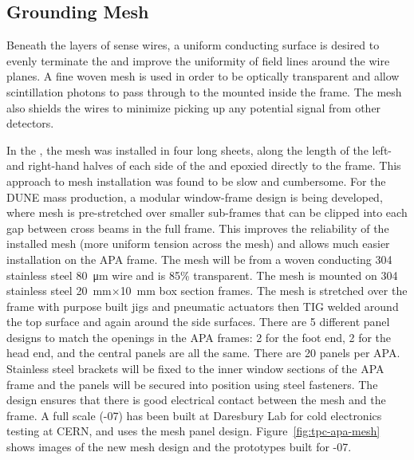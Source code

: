 \subsection{Grounding Mesh}
\label{sec:fdsp-apa-mesh}

Beneath the layers of sense wires, a uniform conducting surface is desired to evenly terminate the \efield and improve the uniformity of field lines around the wire planes.  A fine woven mesh is used in order to be optically transparent and allow scintillation photons to pass through to the  mounted inside the frame.  The mesh also shields the wires to minimize picking up any potential signal from other detectors.  

In the  , the mesh was installed in four long sheets, along the length of the left- and right-hand halves of each side of the  and epoxied directly to the frame. This approach to mesh installation was found to be slow and cumbersome.  For the DUNE mass production, a modular window-frame design is being developed, where mesh is pre-stretched over smaller sub-frames that can be clipped into each gap between cross beams in the full  frame.   This improves the reliability of the installed mesh (more uniform tension across the mesh) and allows much easier installation on the APA frame. The mesh will be from a woven conducting 304 stainless steel \SI{80}{\um} wire and is 85\% transparent. The mesh is mounted on 304 stainless steel \SI{20}{mm}$\times$\SI{10}{mm} box section frames. The mesh is stretched over the frame with purpose built jigs and pneumatic actuators then TIG welded around the top surface and again around the side surfaces. There are 5 different panel designs to match the openings in the APA frames: 2 for the foot end, 2 for the head end, and the central panels are all the same. There are 20 panels per APA. Stainless steel brackets will be fixed to the inner window sections of the APA frame and the panels will be secured into position using steel fasteners. The design ensures that there is good electrical contact between the mesh and the frame. A full scale  (-07) has been built at Daresbury Lab for cold electronics testing at CERN, and uses the mesh panel design. Figure~\ref{fig:tpc-apa-mesh} shows images of the new mesh design and the prototypes built for -07.

